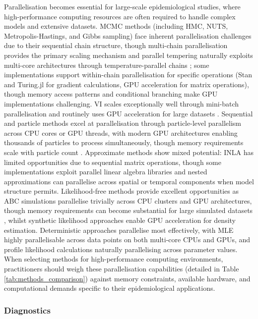 \documentclass{article}
\begin{document}
Parallelisation becomes essential for large-scale epidemiological studies, where high-performance computing resources are often required to handle complex models and extensive datasets.
MCMC methods (including HMC, NUTS, Metropolis-Hastings, and Gibbs sampling) face inherent parallelisation challenges due to their sequential chain structure, though multi-chain parallelisation provides the primary scaling mechanism and parallel tempering naturally exploits multi-core architectures through temperature-parallel chains \citep{surjanovic2023pigeons}; some implementations support within-chain parallelisation for specific operations (Stan and Turing.jl for gradient calculations, GPU acceleration for matrix operations), though memory access patterns and conditional branching make GPU implementations challenging.
VI scales exceptionally well through mini-batch parallelisation and routinely uses GPU acceleration for large datasets \citep{hoffman2013stochastic, bingham2019pyro}.
Sequential and particle methods excel at parallelisation through particle-level parallelism across CPU cores or GPU threads, with modern GPU architectures enabling thousands of particles to process simultaneously, though memory requirements scale with particle count \citep{henriksen2012parallel}.
Approximate methods show mixed potential: INLA has limited opportunities due to sequential matrix operations, though some implementations exploit parallel linear algebra libraries and nested approximations can parallelise across spatial or temporal components when model structure permits.
Likelihood-free methods provide excellent opportunities as ABC simulations parallelise trivially across CPU clusters and GPU architectures, though memory requirements can become substantial for large simulated datasets \citep{kulkarni2022hardware}, whilst synthetic likelihood approaches enable GPU acceleration for density estimation.
Deterministic approaches parallelise most effectively, with MLE highly parallelisable across data points on both multi-core CPUs and GPUs, and profile likelihood calculations naturally parallelising across parameter values.
When selecting methods for high-performance computing environments, practitioners should weigh these parallelisation capabilities (detailed in Table \ref{tab:methods_comparison}) against memory constraints, available hardware, and computational demands specific to their epidemiological applications.


\subsubsection{Diagnostics}
\end{document}
